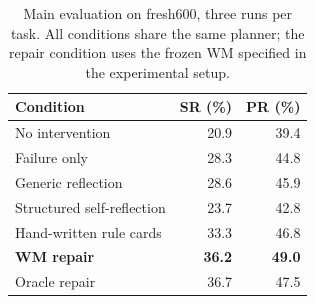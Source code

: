 \begin{table}[tbp]
\caption{Main evaluation on fresh600, three runs per task. All conditions share the same planner; the repair condition uses the frozen WM specified in the experimental setup.}
\label{tab:main}\centering
\begin{tabular}{lrr}\toprule
Condition & SR (\%) & PR (\%)\\\midrule
No intervention & 20.9 & 39.4\\
Failure only & 28.3 & 44.8\\
Generic reflection & 28.6 & 45.9\\
Structured self-reflection & 23.7 & 42.8\\
Hand-written rule cards & 33.3 & 46.8\\
\textbf{WM repair} & \textbf{36.2} & \textbf{49.0}\\
Oracle repair & 36.7 & 47.5\\\bottomrule
\end{tabular}
\end{table}
